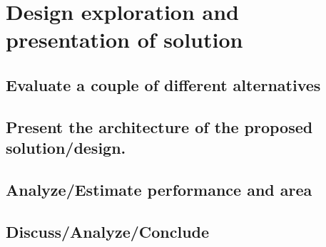 \section{Design exploration and presentation of solution}
\subsection{Evaluate a couple of different alternatives}
\subsection{Present the architecture of the proposed solution/design.}
\subsection{Analyze/Estimate performance and area}
\subsection{Discuss/Analyze/Conclude}